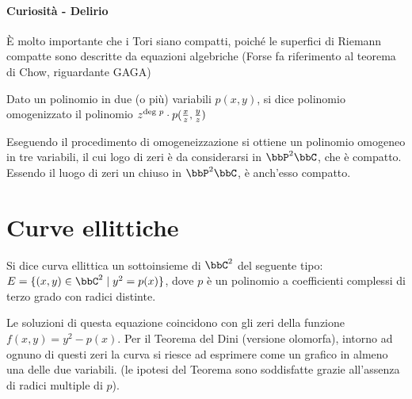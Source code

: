 \paragraph{Curiosità - Delirio}
È molto importante che i Tori siano compatti, poiché le superfici di Riemann compatte sono descritte da equazioni algebriche (Forse fa
riferimento al teorema di Chow, riguardante GAGA)

\begin{definizione}
  Dato un polinomio in due (o più) variabili $p(x,y)$, si dice polinomio omogenizzato il polinomio
  $z^{\text{deg } p} \cdot p(\frac{x}{z}, \frac{y}{z})$
\end{definizione}

\begin{osservazione}
  Eseguendo il procedimento di omogeneizzazione si ottiene un polinomio omogeneo in tre variabili, il cui logo di zeri è da considerarsi in
  $\bbP^2 \bbC$, che è compatto. Essendo il luogo di zeri un chiuso in $\bbP^2 \bbC$, è anch'esso compatto.
\end{osservazione}

\section{Curve ellittiche}
\begin{definizione}
  Si dice curva ellittica un sottoinsieme di $\bbC^2$ del seguente tipo: $E = \{ (x,y) \in \bbC^2 \mid y^2 = p(x) \}$, dove $p$ è un polinomio
  a coefficienti complessi di terzo grado con radici distinte.
\end{definizione}


Le soluzioni di questa equazione coincidono con gli zeri della funzione $f(x,y) = y^2 - p(x)$.  Per il Teorema del Dini (versione olomorfa),
intorno ad ognuno di questi zeri la curva si riesce ad esprimere come un grafico in almeno una delle due variabili.  (le ipotesi del Teorema
sono soddisfatte grazie all'assenza di radici multiple di $p$).

